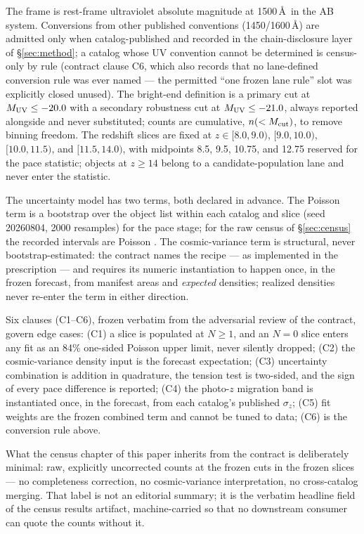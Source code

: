 \documentclass[twocolumn]{aastex702}
\begin{document}
The frame is rest-frame ultraviolet absolute magnitude at 1500\,\AA\ in the AB system.
Conversions from other published conventions (1450/1600\,\AA) are admitted only when
catalog-published and recorded in the chain-disclosure layer of \S\ref{sec:method}; a
catalog whose UV convention cannot be determined is census-only by rule (contract clause
C6, which also records that no lane-defined conversion rule was ever named --- the
permitted ``one frozen lane rule'' slot was explicitly closed unused). The bright-end
definition is a primary cut at $M_{\rm UV}\le-20.0$ with a secondary robustness cut at
$M_{\rm UV}\le-21.0$, always reported alongside and never substituted; counts are
cumulative, $n(<M_{\rm cut})$, to remove binning freedom. The redshift slices are fixed
at $z\in[8.0,9.0)$, $[9.0,10.0)$, $[10.0,11.5)$, and $[11.5,14.0)$, with midpoints 8.5,
9.5, 10.75, and 12.75 reserved for the pace statistic; objects at $z\ge14$ belong to a
candidate-population lane and never enter the statistic.

The uncertainty model has two terms, both declared in advance. The Poisson term is a
bootstrap over the object list within each catalog and slice (seed 20260804, 2000
resamples) for the pace stage; for the raw census of \S\ref{sec:census} the recorded
intervals are Poisson \citep[][68\% two-sided]{gehrels86}. The cosmic-variance term is
structural, never bootstrap-estimated: the contract names the recipe ---
\citet{trenti08} as implemented in the \citet{moster11} prescription --- and requires its
numeric instantiation to happen once, in the frozen forecast, from manifest areas and
\emph{expected} densities; realized densities never re-enter the term in either
direction.

Six clauses (C1--C6), frozen verbatim from the adversarial review of the contract,
govern edge cases: (C1) a slice is populated at $N\ge1$, and an $N=0$ slice enters any
fit as an 84\% one-sided Poisson upper limit, never silently dropped; (C2) the
cosmic-variance density input is the forecast expectation; (C3) uncertainty combination
is addition in quadrature, the tension test is two-sided, and the sign of every pace
difference is reported; (C4) the photo-$z$ migration band is instantiated once, in the
forecast, from each catalog's published $\sigma_z$; (C5) fit weights are the frozen
combined term and cannot be tuned to data; (C6) is the conversion rule above.

What the census chapter of this paper inherits from the contract is deliberately
minimal: raw, explicitly uncorrected counts at the frozen cuts in the frozen slices ---
no completeness correction, no cosmic-variance interpretation, no cross-catalog merging.
That label is not an editorial summary; it is the verbatim headline field of the census
results artifact, machine-carried so that no downstream consumer can quote the counts
without it.
\end{document}
